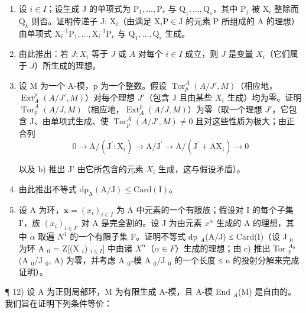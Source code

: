 \begin{enumerate}
\def\labelenumi{\alph{enumi})}
\item
  设 \(i \in I\)；设生成 J 的单项式为 \(\mathrm{P}_{1}, \ldots, \mathrm{P}_{r}\) 与 \(\mathrm{Q}_{1}, \ldots, \mathrm{Q}_{s}\)，其中 \(\mathrm{P}_{j}\) 被 \(\mathrm{X}_{i}\) 整除而 \(\mathrm{Q}_{k}\) 则否。证明传递子 J: \(\mathrm{X}_{i}\)（由满足 \(\mathrm{X}_{i} \mathrm{P} \in \mathrm{J}\) 的元素 P 所组成的 A 的理想）由单项式 \(\mathrm{X}_{i}^{-1} \mathrm{P}_{1}, \ldots, \mathrm{X}_{i}^{-1} \mathrm{P}_{r}\) 与 \(\mathrm{Q}_{1}, \ldots, \mathrm{Q}_{s}\) 生成。
\item
  由此推出：若 \(J: X_i\) 等于 \(J\) 或 \(A\) 对每个 \(i \in I\) 成立，则 \(J\) 是变量 \(X_i\)（它们属于 \(J\)）所生成的理想。
\item
  设 M 为一个 A-模，p 为一个整数。假设 \(\operatorname{Tor}_{p}^{A}(A/J',M)\)（相应地，\(\operatorname{Ext}_{A}^{p}(A/J',M)\)）对每个理想 \(J'\)（包含 J 且由某些 \(X_{i}\) 生成）均为零。证明 \(\operatorname{Tor}_{p}^{A}(A/J,M)\)（相应地，\(\operatorname{Ext}_{A}^{p}(A/J,M)\)）为零（取一个理想 \(J'\)，它包含 J、由单项式生成、使 \(\operatorname{Tor}_{p}^{A}(A/J',M) \neq 0\) 且对这些性质为极大；由正合列
\[
0 \rightarrow \mathrm{A} / (\mathrm{J} ^ {\prime}: \mathrm{X} _ {i}) \longrightarrow \mathrm{A} / \mathrm{J} ^ {\prime} \longrightarrow \mathrm{A} / (\mathrm{J} ^ {\prime} + \mathrm{AX} _ {i}) \rightarrow 0
\]

以及 b) 推出 J' 由它所包含的元素 \(X_{i}\) 生成，这与假设矛盾）。

\item
  由此推出不等式 \(\mathrm{dp}_{\mathrm{A}}(\mathrm{A}/\mathrm{J}) \leqslant \mathrm{Card}(\mathrm{I})\)。

\item
  设 A 为环，\(\mathbf{x} = (x_{i})_{i \in I}\) 为 A 中元素的一个有限族；假设对 I 的每个子集 I′，族 \((x_{i})_{i \in I'}\) 对 A 是完全割的。设 J 为由元素 \(x^{\alpha}\) 生成的 A 的理想，其中 \(\alpha\) 取遍 \(N^{1}\) 的一个有限子集 F。证明不等式 dp \(_{A}\)(A/J) ≤ Card(I)（设 J \(_{0}\) 为环 A \(_{0}\) = Z{[}(X \(_{i}\)) \(_{i \in I}\){]} 中由诸 \(X^{\alpha}\)（\(\alpha \in F\)）生成的理想；由 c) 推出 Tor \(_{p}^{A_{0}}\)(A \(_{0}\)/J \(_{0}\), A) 为零，并考虑 A \(_{0}\)-模 A \(_{0}\)/J \(_{0}\) 的一个长度 ≤ n 的投射分解来完成证明）。
\end{enumerate}

¶ 12) 设 A 为正则局部环，M 为有限生成 A-模，且 A-模 End \(_{A}\)(M) 是自由的。我们旨在证明下列条件等价：

